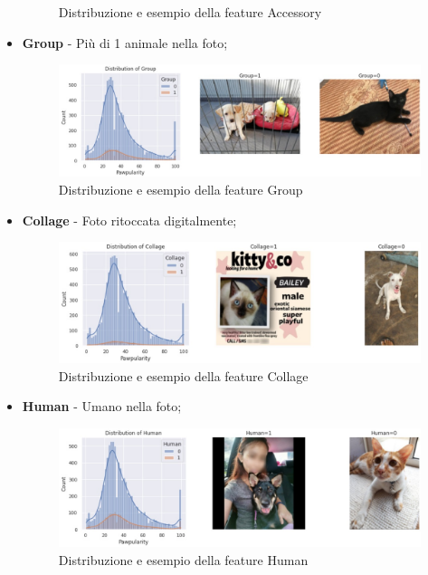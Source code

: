 \begin{itemize}
\begin{figure}[H]
            \caption{Distribuzione e esempio della feature Accessory}
            \label{fig:accessory}
        \end{figure}
        \item \textbf{Group} - Più di 1 animale nella foto;
        \begin{figure}[H]
            \centering
            \includegraphics[scale=0.5]{Plot/distribution_group.jpg}
            \caption{Distribuzione e esempio della feature Group}
            \label{fig:group}
        \end{figure}
        \item \textbf{Collage} - Foto ritoccata digitalmente;
        \begin{figure}[H]
            \centering
            \includegraphics[scale=0.5]{Plot/distribution_collage.jpg}
            \caption{Distribuzione e esempio della feature Collage}
            \label{fig:collage}
        \end{figure}
        \item \textbf{Human} - Umano nella foto;
        \begin{figure}[H]
            \centering
            \includegraphics[scale=0.5]{Plot/distribution_human.jpg}
            \caption{Distribuzione e esempio della feature Human}

\end{figure}
\end{itemize}
